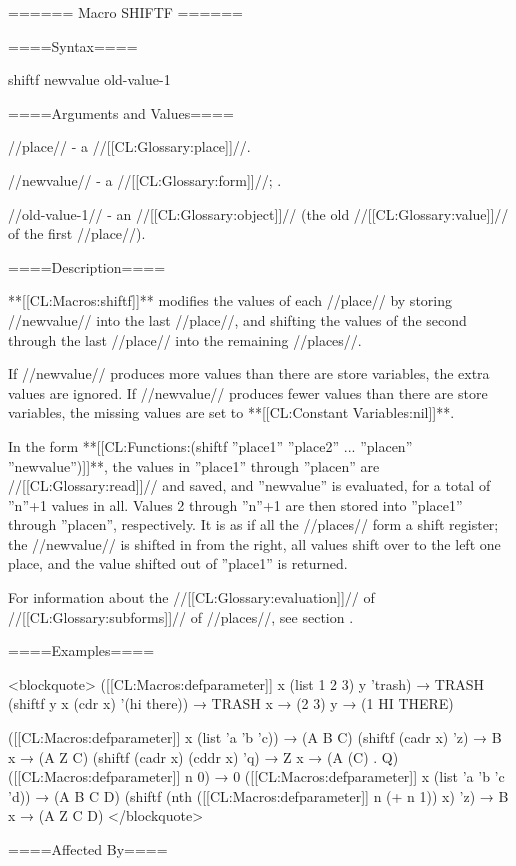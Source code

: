 ====== Macro SHIFTF ======

====Syntax====

\DefmacWithValues shiftf { newvalue} {old-value-1}

====Arguments and Values====

//place// - a //[[CL:Glossary:place]]//.

//newvalue// - a //[[CL:Glossary:form]]//; \eval.

//old-value-1// - an //[[CL:Glossary:object]]// (the old //[[CL:Glossary:value]]// of the first //place//).

====Description====

**[[CL:Macros:shiftf]]** modifies the values of each //place// by storing //newvalue// into the last //place//, and shifting the values of the second through the last //place// into the remaining //places//.

If //newvalue// produces more values than there are store variables, the extra values are ignored. If //newvalue// produces fewer values than there are store variables, the missing values are set to **[[CL:Constant Variables:nil]]**.

In the form **[[CL:Functions:(shiftf ''place1'' ''place2'' ... ''placen'' ''newvalue'')]]**, the values in ''place1'' through ''placen'' are //[[CL:Glossary:read]]// and saved, and ''newvalue'' is evaluated, for a total of ''n''+1 values in all. Values 2 through ''n''+1 are then stored into ''place1'' through ''placen'', respectively. It is as if all the //places// form a shift register; the //newvalue// is shifted in from the right, all values shift over to the left one place, and the value shifted out of ''place1'' is returned.

For information about the //[[CL:Glossary:evaluation]]// of //[[CL:Glossary:subforms]]// of //places//, see section {\secref\GenRefSubFormEval}.

====Examples====

<blockquote> ([[CL:Macros:defparameter]] x (list 1 2 3) y 'trash) → TRASH (shiftf y x (cdr x) '(hi there)) → TRASH x → (2 3) y → (1 HI THERE)

([[CL:Macros:defparameter]] x (list 'a 'b 'c)) → (A B C) (shiftf (cadr x) 'z) → B x → (A Z C) (shiftf (cadr x) (cddr x) 'q) → Z x → (A (C) . Q) ([[CL:Macros:defparameter]] n 0) → 0 ([[CL:Macros:defparameter]] x (list 'a 'b 'c 'd)) → (A B C D) (shiftf (nth ([[CL:Macros:defparameter]] n (+ n 1)) x) 'z) → B x → (A Z C D) </blockquote>

====Affected By====

